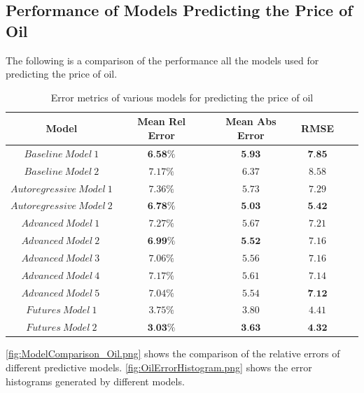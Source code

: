 \documentclass[runningheads]{llncs}
\begin{document}
\subsection{Performance of Models Predicting the Price of Oil}

\noindent The following is a comparison of the performance all the models used for predicting the price of oil.

\begin{table}
\begin{center}
\begin{tabular}{|c|c|c|c|c|c}
\hline
\textbf{Model} & \textbf{Mean Rel Error} & \textbf{Mean Abs Error} & \textbf{RMSE} \\ \hline \hline

$ Baseline\ Model\ 1 $ & $ \textbf{6.58\%} $ & $ \textbf{5.93} $ & $ \textbf{7.85} $ \\ \hline
$ Baseline\ Model\ 2 $ & $7.17\%$ & $6.37$ & $8.58$ \\ \hline\hline

$ Autoregressive\ Model\ 1 $ & $7.36\%$ & $5.73$ & $7.29$\\ \hline
$ Autoregressive\ Model\ 2 $ & $ \textbf{6.78\%} $ & $ \textbf{5.03}$ & $\textbf{5.42}$ \\ \hline\hline

$ Advanced\ Model\ 1\ $ & $7.27\%$ & $5.67$ & $7.21$ \\ \hline
$ Advanced\ Model\ 2\ $ & $ \textbf{6.99\%} $ & $ \textbf{5.52} $ & $7.16$ \\ \hline
$ Advanced\ Model\ 3\ $ & $7.06\%$ & $5.56$ & $7.16$ \\ \hline
$ Advanced\ Model\ 4\ $ & $7.17\%$ & $5.61$ & $7.14$ \\ \hline
$ Advanced\ Model\ 5\ $ & $7.04\%$ & $5.54$ & $ \textbf{7.12} $ \\ \hline\hline
$ Futures\ Model\ 1 $ & $3.75\%$ & $3.80$ & $4.41$ \\ \hline
$ Futures\ Model\ 2 $ & $ \textbf{3.03\%} $ & $\textbf{3.63}$ & $\textbf{4.32}$ \\ \hline
\end{tabular}
\end{center} 
\caption{Error metrics of various models for predicting the price of oil}
\end{table} 

\autoref{fig:ModelComparison_Oil.png} shows the comparison of the relative errors of different predictive models. \autoref{fig:OilErrorHistogram.png} shows the error histograms generated by different models.
\end{document}
